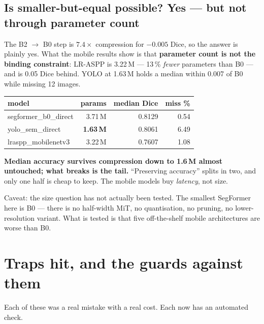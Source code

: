 \documentclass[11pt]{article}
\begin{document}
\subsection{Is smaller-but-equal possible? Yes --- but not through parameter count}

The B2 $\rightarrow$ B0 step is $7.4\times$ compression for $-0.005$ Dice, so the
answer is plainly yes. What the mobile results show is that \textbf{parameter
count is not the binding constraint}: LR-ASPP is 3.22\,M --- 13\,\% \emph{fewer}
parameters than B0 --- and is 0.05 Dice behind. YOLO at 1.63\,M holds a median
within 0.007 of B0 while missing 12 images.

\begin{center}
\begin{tabular}{Lnnn}
\toprule
\textbf{model} & \textbf{params} & \textbf{median Dice} & \textbf{miss \%} \\
\midrule
segformer\_b0\_direct & 3.71\,M & 0.8129 & 0.54 \\
yolo\_sem\_direct & \textbf{1.63\,M} & 0.8061 & 6.49 \\
lraspp\_mobilenetv3 & 3.22\,M & 0.7607 & 1.08 \\
\bottomrule
\end{tabular}
\end{center}

\textbf{Median accuracy survives compression down to 1.6\,M almost untouched;
what breaks is the tail.} ``Preserving accuracy'' splits in two, and only one half
is cheap to keep. The mobile models buy \emph{latency}, not size.

Caveat: the size question has not actually been tested. The smallest SegFormer
here is B0 --- there is no half-width MiT, no quantisation, no pruning, no
lower-resolution variant. What is tested is that five off-the-shelf mobile
architectures are worse than B0.

\section{Traps hit, and the guards against them}

Each of these was a real mistake with a real cost. Each now has an automated
check.
\end{document}
